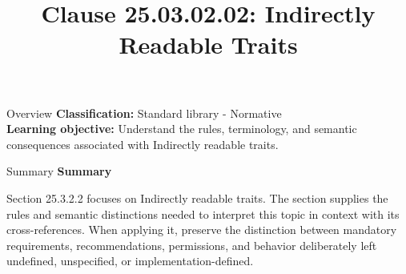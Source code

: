 \documentclass[10pt,letterpaper]{article}
\title{Clause 25.03.02.02: Indirectly Readable Traits}
\author{}
\date{}
\begin{document}
\maketitle
\begin{CornellOverviewBox}{Overview}
\textbf{Classification:} Standard library - Normative\\[2pt]
\textbf{Learning objective:} Understand the rules, terminology, and semantic consequences associated with Indirectly readable traits.
\end{CornellOverviewBox}\begin{CornellSummaryBox}{Summary}
{\sffamily\bfseries\color{Accent} Summary}\par\vspace{3pt}Section 25.3.2.2 focuses on Indirectly readable traits. The section supplies the rules and semantic distinctions needed to interpret this topic in context with its cross-references. When applying it, preserve the distinction between mandatory requirements, recommendations, permissions, and behavior deliberately left undefined, unspecified, or implementation-defined.
\end{CornellSummaryBox}
\end{document}
